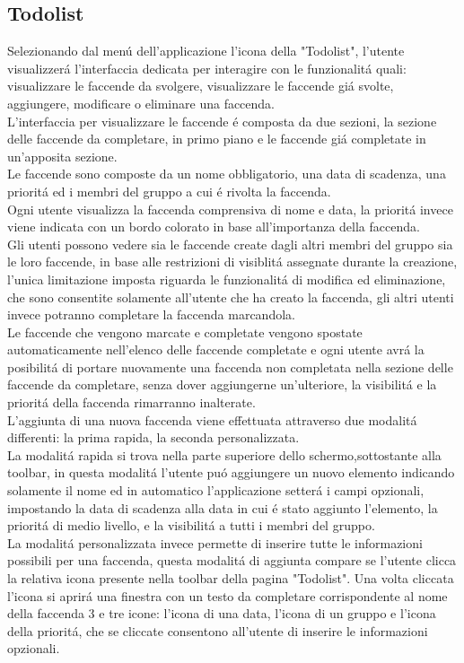 \subsection{Todolist}
Selezionando dal men\'u dell'applicazione l'icona della "Todolist", l'utente visualizzer\'a l'interfaccia dedicata per interagire con le funzionalit\'a quali: visualizzare le faccende da svolgere, visualizzare le faccende gi\'a  svolte, aggiungere, modificare o eliminare una faccenda.\\
L'interfaccia per visualizzare le faccende \'e composta da due sezioni, la sezione delle faccende da completare, in primo piano e le faccende gi\'a completate in un'apposita sezione.\\
Le faccende sono composte da un nome obbligatorio, una data di scadenza, una priorit\'a ed i membri del gruppo a cui \'e rivolta la faccenda.\\
Ogni utente visualizza la faccenda comprensiva di nome e data, la priorit\'a invece viene indicata con un bordo colorato in base all'importanza della faccenda.\\
Gli utenti possono vedere sia le faccende create dagli altri membri del gruppo sia le loro faccende, in base alle restrizioni di visiblit\'a assegnate durante la creazione, l'unica limitazione imposta riguarda le funzionalit\'a di modifica ed eliminazione, che sono consentite solamente all'utente che ha creato la faccenda, gli altri utenti invece potranno completare la faccenda marcandola.\\
Le faccende che vengono marcate e completate vengono spostate automaticamente nell'elenco delle faccende completate e ogni utente avr\'a la posibilit\'a di portare nuovamente una faccenda non completata nella sezione delle faccende da completare, senza dover aggiungerne un'ulteriore, la visibilit\'a e la priorit\'a della faccenda rimarranno inalterate.\\
L'aggiunta di una nuova faccenda viene effettuata attraverso due modalit\'a differenti: la prima rapida, la seconda personalizzata.\\
La modalit\'a rapida si trova nella parte superiore dello schermo,sottostante alla toolbar, in questa modalit\'a l'utente pu\'o aggiungere un nuovo elemento indicando solamente il nome ed in automatico l'applicazione setter\'a i campi opzionali, impostando la data di scadenza alla data in cui \'e stato aggiunto l'elemento, la priorit\'a di medio livello, e la visibilit\'a a tutti i membri del gruppo.\\
La modalit\'a personalizzata invece permette di inserire tutte le informazioni possibili per una faccenda, questa modalit\'a di aggiunta compare se l'utente clicca la relativa icona presente nella toolbar della pagina "Todolist". Una volta cliccata l'icona si aprir\'a una finestra con un testo da completare corrispondente al nome della faccenda 3 e tre icone: l'icona di una data, l'icona di un gruppo e l'icona della priorit\'a, che se cliccate consentono all'utente di inserire le informazioni opzionali.

